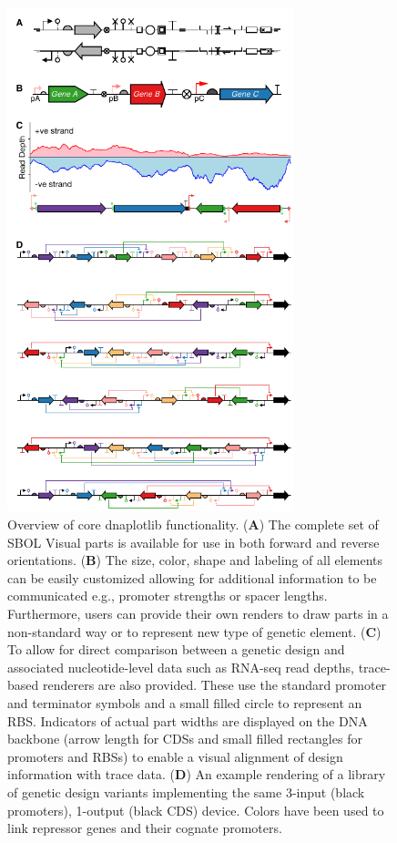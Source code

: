 \documentclass{bioinfo}
\begin{document}
\begin{figure}[t]
\centering
\includegraphics[width=8.3cm]{Figure1.pdf}
\caption{\label{fig:overview}Overview of core dnaplotlib functionality. (\textbf{A}) The complete set of SBOL Visual parts is available for use in both forward and reverse orientations. (\textbf{B}) The size, color, shape and labeling of all elements can be easily customized allowing for additional information to be communicated e.g., promoter strengths or spacer lengths. Furthermore, users can provide their own renders to draw parts in a non-standard way or to represent new type of genetic element. (\textbf{C}) To allow for direct comparison between a genetic design and associated nucleotide-level data such as RNA-seq read depths, trace-based renderers are also provided. These use the standard promoter and terminator symbols and a small filled circle to represent an RBS. Indicators of actual part widths are displayed on the DNA backbone (arrow length for CDSs and small filled rectangles for promoters and RBSs) to enable a visual alignment of design information with trace data. (\textbf{D}) An example rendering of a library of genetic design variants implementing the same 3-input (black promoters), 1-output (black CDS) device. Colors have been used to link repressor genes and their cognate promoters.}
\end{figure}
\end{document}
